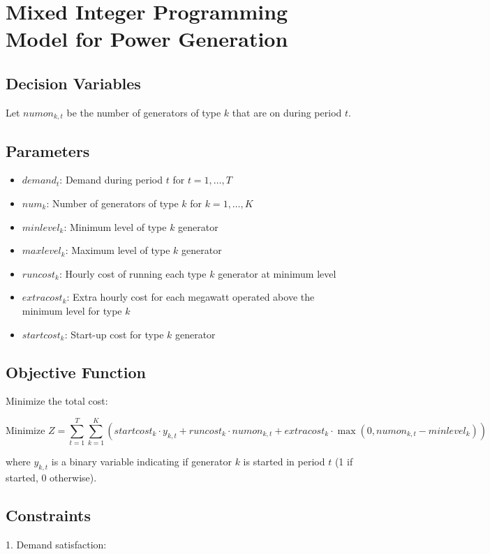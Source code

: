 \documentclass{article}
\begin{document}
\section*{Mixed Integer Programming Model for Power Generation}

\subsection*{Decision Variables}
Let \( numon_{k,t} \) be the number of generators of type \( k \) that are on during period \( t \).

\subsection*{Parameters}
\begin{itemize}
    \item \( demand_t \): Demand during period \( t \) for \( t = 1, \ldots, T \)
    \item \( num_k \): Number of generators of type \( k \) for \( k = 1, \ldots, K \)
    \item \( minlevel_k \): Minimum level of type \( k \) generator
    \item \( maxlevel_k \): Maximum level of type \( k \) generator
    \item \( runcost_k \): Hourly cost of running each type \( k \) generator at minimum level
    \item \( extracost_k \): Extra hourly cost for each megawatt operated above the minimum level for type \( k \)
    \item \( startcost_k \): Start-up cost for type \( k \) generator
\end{itemize}

\subsection*{Objective Function}
Minimize the total cost:

\[
\text{Minimize } Z = \sum_{t=1}^{T} \sum_{k=1}^{K} \left( startcost_k \cdot y_{k,t} + runcost_k \cdot numon_{k,t} + extracost_k \cdot \max(0, numon_{k,t} - minlevel_k) \right)
\]

where \( y_{k,t} \) is a binary variable indicating if generator \( k \) is started in period \( t \) (1 if started, 0 otherwise).

\subsection*{Constraints}
1. Demand satisfaction:
\end{document}
